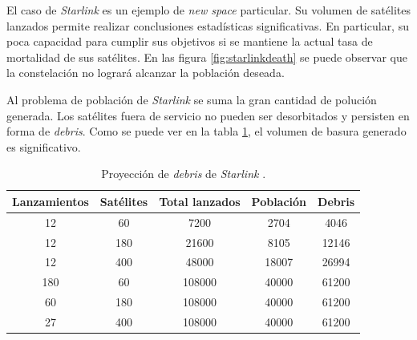 El caso de \emph{Starlink} es un ejemplo de \emph{new space} particular.
Su volumen de satélites lanzados permite realizar conclusiones estadísticas significativas.
En particular, su poca capacidad para cumplir sus objetivos si se mantiene la actual tasa de mortalidad de sus satélites.
En las figura \ref{fig:starlinkdeath} se puede observar que la constelación no logrará alcanzar la población deseada.
 
Al problema de población de \emph{Starlink} se suma la gran cantidad de polución generada.
Los satélites fuera de servicio no pueden ser desorbitados y persisten en forma de \emph{debris}.
Como se puede ver en la tabla \ref{tab:starlinkdebris}, el volumen de basura generado es significativo.

\begin{table}[h]
	\centering
    \caption[Proyección de \emph{debris}]{Proyección de \emph{debris} de \emph{Starlink} \citep{ARTICLE:cibils}.}
	\begin{tabular}{c c c c c}    
		\toprule
        \textbf{Lanzamientos} & \textbf{Satélites} & \textbf{Total lanzados} & \textbf{Población} & \textbf{Debris}\\
		\midrule
        12                    & 60                 & 7200                    & 2704               & 4046\\		
        12                    & 180                & 21600                   & 8105               & 12146\\		
        12                    & 400                & 48000                   & 18007              & 26994\\		
        180                   & 60                 & 108000                  & 40000              & 61200\\		
        60                    & 180                & 108000                  & 40000              & 61200\\		
        27                    & 400                & 108000                  & 40000              & 61200\\		
		\bottomrule
		\hline
	\end{tabular}
	\label{tab:starlinkdebris}
\end{table}

\newpage

